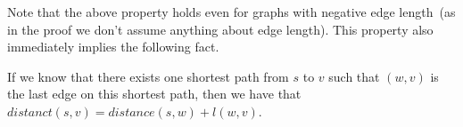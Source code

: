 Note that the above property holds even for graphs with negative edge length~(as
in the proof we don't assume anything about edge length).
This property also immediately implies the following fact.

\begin{property}
If we know that there exists one shortest path from $s$ to $v$ such that $(w,v)$ is the last edge
on this shortest path, then we have that $distanct(s,v) = distance(s,w) + l(w,v)$.
\end{property}
